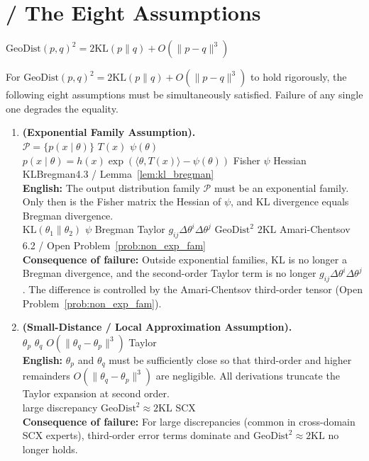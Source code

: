 \documentclass{article}
\newcommand{\GeoDist}{\mathrm{GeoDist}}
\newcommand{\KL}{\mathrm{KL}}
\begin{document}
\section{ / The Eight Assumptions}
\label{sec:assumptions}

 $\GeoDist(p,q)^2 = 2\KL(p\|q) + O(\|p-q\|^3)$ 


For $\GeoDist(p,q)^2 = 2\KL(p\|q) + O(\|p-q\|^3)$ to hold rigorously,
the following eight assumptions must be simultaneously satisfied.
Failure of any single one degrades the equality.

\vspace{1em}

\begin{enumerate}[label=\textbf{H\arabic*:}, leftmargin=*, itemsep=0.8em]

    \item \textbf{ (Exponential Family Assumption).} \\
    \textbf{}  $\mathcal{P} = \{p(x \mid \theta)\}$ 
     $T(x)$  $\psi(\theta)$ 
    $p(x \mid \theta) = h(x) \exp(\langle\theta, T(x)\rangle - \psi(\theta))$
    Fisher $\psi$ Hessian
    KLBregman4.3 / Lemma~\ref{lem:kl_bregman}
    \\[0.3em]
    \textbf{English:} The output distribution family $\mathcal{P}$ must be an exponential family.
    Only then is the Fisher matrix the Hessian of $\psi$, and KL divergence equals Bregman divergence.
    \\[0.3em]
    \textbf{} $\KL(\theta_1\|\theta_2)$  $\psi$ Bregman
    Taylor $g_{ij}\Delta\theta^i\Delta\theta^j$
    $\GeoDist^2$  $2\KL$  Amari-Chentsov 6.2 / Open Problem~\ref{prob:non_exp_fam}
    \\[0.3em]
    \textbf{Consequence of failure:} Outside exponential families, KL is no longer a Bregman divergence,
    and the second-order Taylor term is no longer $g_{ij}\Delta\theta^i\Delta\theta^j$.
    The difference is controlled by the Amari-Chentsov third-order tensor (Open Problem~\ref{prob:non_exp_fam}).

    \item \textbf{ (Small-Distance / Local Approximation Assumption).} \\
    \textbf{} $\theta_p$  $\theta_q$ 
    $O(\|\theta_q - \theta_p\|^3)$ Taylor
    \\[0.3em]
    \textbf{English:} $\theta_p$ and $\theta_q$ must be sufficiently close so that third-order
    and higher remainders $O(\|\theta_q - \theta_p\|^3)$ are negligible. All derivations
    truncate the Taylor expansion at second order.
    \\[0.3em]
    \textbf{} large discrepancy
    $\GeoDist^2 \approx 2\KL$ SCX
    \\[0.3em]
    \textbf{Consequence of failure:} For large discrepancies (common in cross-domain SCX experts),
    third-order error terms dominate and $\GeoDist^2 \approx 2\KL$ no longer holds.


\end{enumerate}
\end{document}
